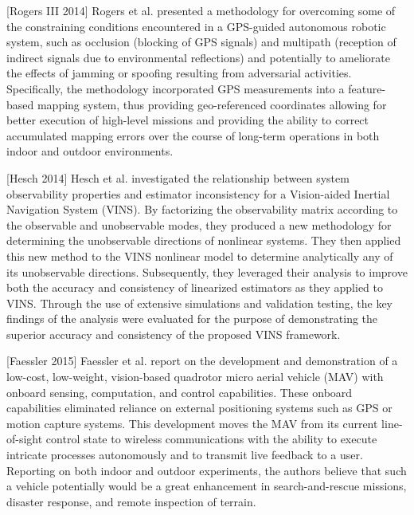 [Rogers III 2014] Rogers et al. presented a methodology for overcoming some of the constraining conditions encountered in a GPS-guided autonomous robotic system, such as occlusion (blocking of GPS signals) and multipath (reception of indirect signals due to environmental reflections) and potentially to ameliorate the effects of jamming or spoofing resulting from adversarial activities. Specifically, the methodology incorporated GPS measurements into a feature-based mapping system, thus providing geo-referenced coordinates allowing for better execution of high-level missions and providing the ability to correct accumulated mapping errors over the course of long-term operations in both indoor and outdoor environments.

[Hesch 2014] Hesch et al. investigated the relationship between system observability properties and estimator inconsistency for a Vision-aided Inertial Navigation System (VINS). By factorizing the observability matrix according to the observable and unobservable modes, they produced a new methodology for determining the unobservable directions of nonlinear systems. They then applied this new method to the VINS nonlinear model to determine analytically any of its unobservable directions. Subsequently, they leveraged their analysis to improve both the accuracy and consistency of linearized estimators as they applied to VINS. Through the use of extensive simulations and validation testing, the key findings of the analysis were evaluated for the purpose of demonstrating the superior accuracy and consistency of the proposed VINS framework.

[Faessler 2015] Faessler et al. report on the development and demonstration of a low-cost, low-weight, vision-based quadrotor micro aerial vehicle (MAV) with onboard sensing, computation, and control capabilities. These onboard capabilities eliminated reliance on external positioning systems such as GPS or motion capture systems. This development moves the MAV from its current line-of-sight control state to wireless communications with the ability to execute intricate processes autonomously and to transmit live feedback to a user. Reporting on both indoor and outdoor experiments, the authors believe that such a vehicle potentially would be a great enhancement in search-and-rescue missions, disaster response, and remote inspection of terrain. 
